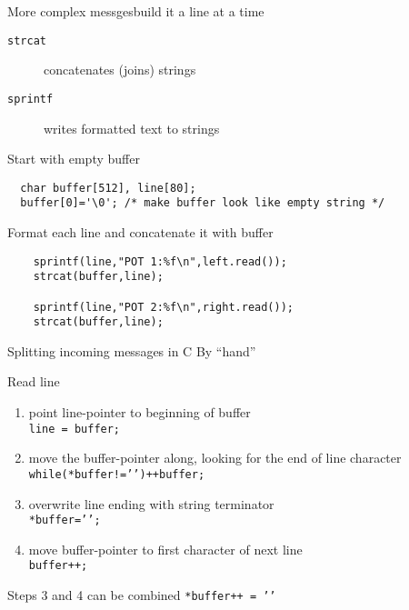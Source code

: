\documentclass[xcolor=svgnames]{beamer}
\begin{document}
\begin{frame}[fragile]{More complex messges}{build it a line at a time}
\begin{description}
    \item[\texttt{strcat}] concatenates (joins) strings
    \item[\texttt{sprintf}] writes formatted text to strings
\end{description}
Start with empty buffer
\begin{exampleblock}{}
\begin{verbatim}
  char buffer[512], line[80];
  buffer[0]='\0'; /* make buffer look like empty string */
\end{verbatim}
\end{exampleblock}
Format each line and concatenate it with buffer
\begin{exampleblock}{}
\begin{verbatim}
    sprintf(line,"POT 1:%f\n",left.read());
    strcat(buffer,line);

    sprintf(line,"POT 2:%f\n",right.read());
    strcat(buffer,line);

\end{verbatim}
\end{exampleblock}

\end{frame}

\begin{frame}[fragile]{Splitting incoming messages in C}
    By ``hand''
    \begin{block}{Read line}
    \begin{enumerate}
        \item point line-pointer to beginning of buffer\\
            \hfill\texttt{line = buffer;}
        \item move the buffer-pointer along, looking for the end of line character \\\hfill\texttt{while(*buffer!='\n')++buffer;}
        \item overwrite line ending with string terminator\\
        \hfill\texttt{*buffer='\0';}
        \item move buffer-pointer to first character of next line\\
        \hfill\texttt{buffer++;}
    \end{enumerate}
    \end{block}
    \begin{exampleblock}{Steps 3 and 4 can be combined}
        \hfill\texttt{*buffer++ = '\0'}
    \end{exampleblock}
\end{frame}
\end{document}
